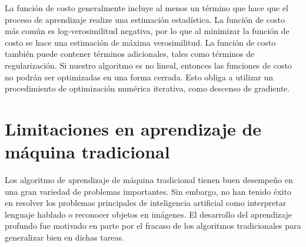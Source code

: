 \vspace{1em}

La función de costo generalmente incluye al menos un término que hace que el proceso de aprendizaje realize una estimación estadística. La función de costo más común es log-verosimilitud negativa, por lo que al minimizar la función de costo se hace una estimación de máxima verosimilitud. La función de costo también puede contener términos adicionales, tales como términos de regularización. Si nuestro algoritmo es no lineal, entonces las funciones de costo no podrán ser optimizadas en una forma cerrada. Esto obliga a utilizar un procedimiento de optimización numérica iterativa, como descenso de gradiente. 
\cite{goodfellow-et-al-2016}

\section{Limitaciones en aprendizaje de máquina tradicional}
Los algoritmo de aprendizaje de máquina tradicional tienen buen desempeño en una gran variedad de problemas importantes. Sin embargo, no han tenido éxito en resolver los problemas principales de inteligencia artificial como interpretar lenguaje hablado o reconocer objetos en imágenes. El desarrollo del aprendizaje profundo fue motivado en parte por el fracaso de los algoritmos tradicionales para generalizar bien en dichas tareas.
